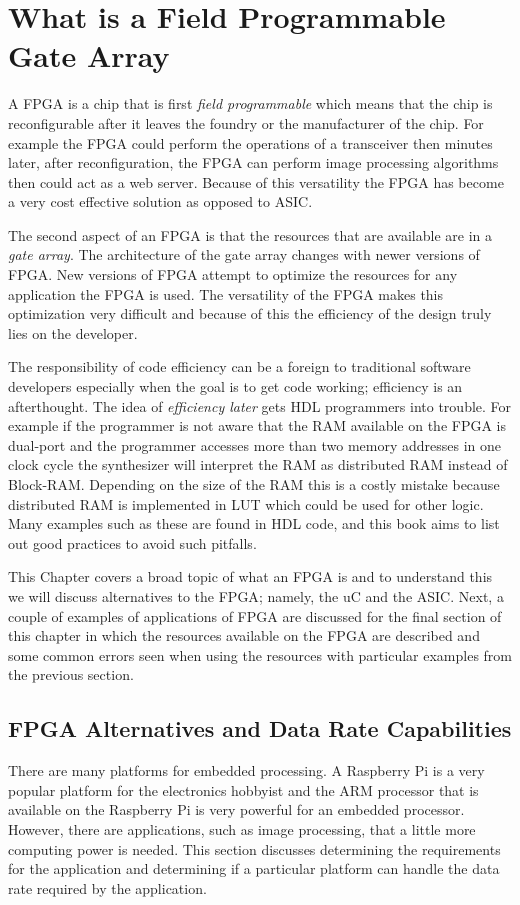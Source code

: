 \chapter{What is a Field Programmable Gate Array}
A \ac{FPGA} is a chip that is first \emph{field programmable} which means that the chip is reconfigurable after it leaves the foundry or the manufacturer of the chip. For example the \ac{FPGA} could perform the operations of a transceiver then minutes later, after reconfiguration, the \ac{FPGA} can perform image processing algorithms then could act as a web server. Because of this versatility the \ac{FPGA} has become a very cost effective solution as opposed to \ac{ASIC}.

The second aspect of an \ac{FPGA} is that the resources that are available are in a \emph{gate array}. The architecture of the gate array changes with newer versions of \ac{FPGA}. New versions of \ac{FPGA} attempt to optimize the resources for any application the \ac{FPGA} is used. The versatility of the \ac{FPGA} makes this optimization very difficult and because of this the efficiency of the design truly lies on the developer.

The responsibility of code efficiency can be a foreign to traditional software developers especially when the goal is to get code working; efficiency is an afterthought. The idea of \emph{efficiency later} gets \ac{HDL} programmers into trouble. For example if the programmer is not aware that the \ac{RAM} available on the \ac{FPGA} is dual-port and the programmer accesses more than two memory addresses in one clock cycle the synthesizer will interpret the \ac{RAM} as distributed \ac{RAM} instead of Block-\ac{RAM}. Depending on the size of the \ac{RAM} this is a costly mistake because distributed \ac{RAM} is implemented in \ac{LUT} which could be used for other logic. Many examples such as these are found in \ac{HDL} code, and this book aims to list out good practices to avoid such pitfalls.

This Chapter covers a broad topic of what an \ac{FPGA} is and to understand this we will discuss alternatives to the \ac{FPGA}; namely, the \ac{uC} and the \ac{ASIC}. Next, a couple of examples of applications of \ac{FPGA} are discussed for the final section of this chapter in which the resources available on the \ac{FPGA} are described and some common errors seen when using the resources with particular examples from the previous section. 


\section{FPGA Alternatives and Data Rate Capabilities}
There are many platforms for embedded processing. A Raspberry Pi is a very popular platform for the electronics hobbyist and the ARM processor that is available on the Raspberry Pi is very powerful for an embedded processor. However, there are applications, such as image processing, that a little more computing power is needed. This section discusses determining the requirements for the application and determining if a particular platform can handle the data rate required by the application. 


